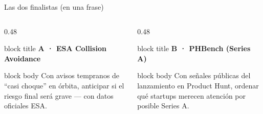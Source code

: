 \documentclass[aspectratio=169,10pt]{beamer}
\begin{document}
\begin{frame}{Las dos finalistas (en una frase)}
  \begin{columns}[T]
    \begin{column}{0.48\textwidth}
      \begin{beamercolorbox}[wd=\textwidth,rounded=true,sep=6pt]{block title}
        \textbf{A · ESA Collision Avoidance}
      \end{beamercolorbox}
      \begin{beamercolorbox}[wd=\textwidth,rounded=true,sep=6pt]{block body}
        \scriptsize Con avisos tempranos de ``casi choque'' en órbita, anticipar si el riesgo final será grave --- con datos oficiales ESA.
      \end{beamercolorbox}
    \end{column}
    \begin{column}{0.48\textwidth}
      \begin{beamercolorbox}[wd=\textwidth,rounded=true,sep=6pt]{block title}
        \textbf{B · PHBench (Series A)}
      \end{beamercolorbox}
      \begin{beamercolorbox}[wd=\textwidth,rounded=true,sep=6pt]{block body}
        \scriptsize Con señales públicas del lanzamiento en Product Hunt, ordenar qué startups merecen atención por posible Series A.
      \end{beamercolorbox}
    \end{column}
  \end{columns}
  \vspace{0.6em}
  \begin{center}
  \end{center}
\end{frame}
\end{document}
